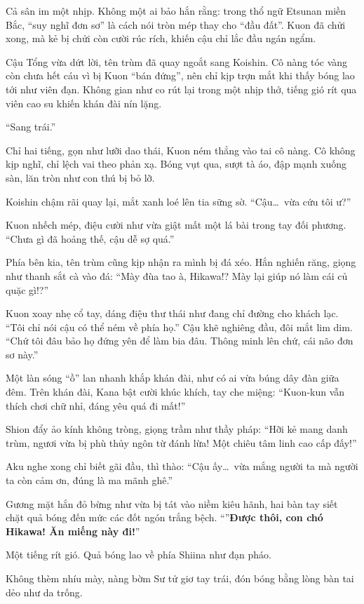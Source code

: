 \documentclass[../main.tex]{subfiles}
\begin{document}
Cả sân im một nhịp. Không một ai bảo hắn rằng: trong thổ ngữ Etsunan miền Bắc, ``suy nghĩ đơn sơ'' là cách nói tròn mép thay cho ``đầu đất''. Kuon đã chửi xong, mà kẻ bị chửi còn cười rúc rích, khiến cậu chỉ lắc đầu ngán ngẩm.

Cậu Tổng vừa dứt lời, tên trùm đã quay ngoắt sang Koishin. Cô nàng tóc vàng còn chưa hết cáu vì bị Kuon ``bán đứng'', nên chỉ kịp trợn mắt khi thấy bóng lao tới như viên đạn. Không gian như co rút lại trong một nhịp thở, tiếng gió rít qua viên cao su khiến khán đài nín lặng.

``Sang trái.''

Chỉ hai tiếng, gọn như lưỡi dao thái, Kuon ném thẳng vào tai cô nàng. Cô không kịp nghĩ, chỉ lệch vai theo phản xạ. Bóng vụt qua, sượt tà áo, đập mạnh xuống sàn, lăn tròn như con thú bị bỏ lỡ.

Koishin chậm rãi quay lại, mắt xanh loé lên tia sững sờ. ``Cậu\dots\ vừa cứu tôi ư?''

Kuon nhếch mép, điệu cười như vừa giật mất một lá bài trong tay đối phương. ``Chưa gì đã hoảng thế, cậu dễ sợ quá.''

Phía bên kia, tên trùm cũng kịp nhận ra mình bị đá xéo. Hắn nghiến răng, giọng như thanh sắt cà vào đá: ``Mày đùa tao à, Hikawa!? Mày lại giúp nó làm cái củ quặc gì!?''

Kuon xoay nhẹ cổ tay, dáng điệu thư thái như đang chỉ đường cho khách lạc. ``Tôi chỉ nói cậu có thể ném về phía họ.'' Cậu khẽ nghiêng đầu, đôi mắt lim dim. ``Chứ tôi đâu bảo họ đứng yên để làm bia đâu. Thông minh lên chứ, cái não đơn sơ này.''

Một làn sóng ``ồ'' lan nhanh khắp khán đài, như có ai vừa búng dây đàn giữa đêm. Trên khán đài, Kana bật cười khúc khích, tay che miệng: ``Kuon-kun vẫn thích chơi chữ nhỉ, đáng yêu quá đi mất!''

Shion đẩy ảo kính không tròng, giọng trầm như thầy pháp: ``Hỡi kẻ mang danh trùm, ngươi vừa bị phù thủy ngôn từ đánh lừa! Một chiêu tâm linh cao cấp đấy!''

Aku nghe xong chỉ biết gãi đầu, thì thào: ``Cậu ấy\dots\ vừa mắng người ta mà người ta còn cảm ơn, đúng là ma mãnh ghê.''

Gương mặt hắn đỏ bừng như vừa bị tát vào niềm kiêu hãnh, hai bàn tay siết chặt quả bóng đến mức các đốt ngón trắng bệch. ``''\textbf{Được thôi, con chó Hikawa! Ăn miếng này đi!}''

Một tiếng rít gió. Quả bóng lao về phía Shiina như đạn pháo.

Không thèm nhíu mày, nàng bờm Sư tử giơ tay trái, đón bóng bằng lòng bàn tai dẻo như da trống.
\end{document}
